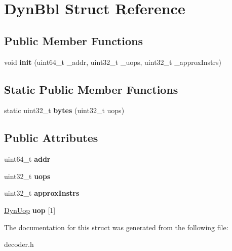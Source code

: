 \hypertarget{structDynBbl}{\section{Dyn\-Bbl Struct Reference}
\label{structDynBbl}
}
\subsection*{Public Member Functions}
\begin{DoxyCompactItemize}
\item 
\hypertarget{structDynBbl_aa2a47443851deb46b1e6cb8005fb5c73}{void {\bfseries init} (uint64\-\_\-t \-\_\-addr, uint32\-\_\-t \-\_\-uops, uint32\-\_\-t \-\_\-approx\-Instrs)}\label{structDynBbl_aa2a47443851deb46b1e6cb8005fb5c73}

\end{DoxyCompactItemize}
\subsection*{Static Public Member Functions}
\begin{DoxyCompactItemize}
\item 
\hypertarget{structDynBbl_abb2c7976dbf8ee0f787eb153273172ad}{static uint32\-\_\-t {\bfseries bytes} (uint32\-\_\-t uops)}\label{structDynBbl_abb2c7976dbf8ee0f787eb153273172ad}

\end{DoxyCompactItemize}
\subsection*{Public Attributes}
\begin{DoxyCompactItemize}
\item 
\hypertarget{structDynBbl_abb71dd4e4dbdc3178f94b3d5b2742aab}{uint64\-\_\-t {\bfseries addr}}\label{structDynBbl_abb71dd4e4dbdc3178f94b3d5b2742aab}

\item 
\hypertarget{structDynBbl_a3f765e60798a5498d73f43a72984ecc8}{uint32\-\_\-t {\bfseries uops}}\label{structDynBbl_a3f765e60798a5498d73f43a72984ecc8}

\item 
\hypertarget{structDynBbl_a164ce491b4a0e15ed3f0a0ed9e23eb76}{uint32\-\_\-t {\bfseries approx\-Instrs}}\label{structDynBbl_a164ce491b4a0e15ed3f0a0ed9e23eb76}

\item 
\hypertarget{structDynBbl_a57bd9f35d60370524df19197235d8067}{\hyperlink{structDynUop}{Dyn\-Uop} {\bfseries uop} \mbox{[}1\mbox{]}}\label{structDynBbl_a57bd9f35d60370524df19197235d8067}

\end{DoxyCompactItemize}


The documentation for this struct was generated from the following file\-:\begin{DoxyCompactItemize}
\item 
decoder.\-h\end{DoxyCompactItemize}
